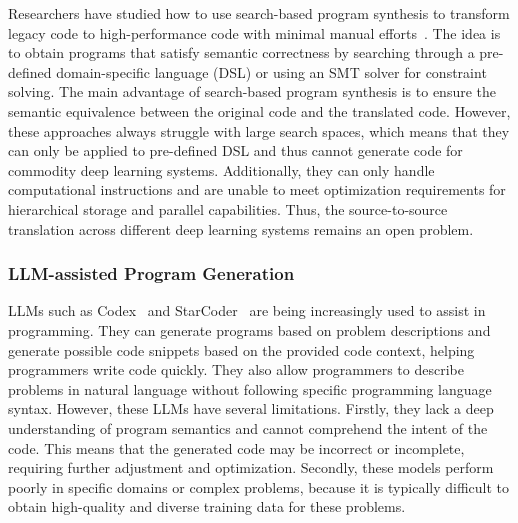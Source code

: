 Researchers have studied how to use search-based program synthesis to transform legacy code to high-performance code with minimal manual efforts~\cite{ikarashi2022exocompilation,bansal2023mosaic,vanhattumvectorization, bhatia_et_al:LIPIcs.ECOOP.2023.38}.
The idea is to obtain programs that satisfy semantic correctness by searching through a pre-defined domain-specific language (DSL) or using an SMT solver for constraint solving.
The main advantage of search-based program synthesis is to ensure
the semantic equivalence between the original code and the translated code.
However, these approaches always struggle with large search spaces, which means that they can only be applied to pre-defined DSL and thus cannot generate code for commodity deep learning systems. Additionally, they can only handle computational instructions and are unable to meet optimization requirements for hierarchical storage and parallel capabilities. Thus, the source-to-source translation across different deep learning systems remains an open problem.

\subsubsection{LLM-assisted Program Generation}
LLMs such as Codex~\cite{chen2021evaluating} and StarCoder~\cite{li2023starcoder} are being increasingly used to assist in programming. They can generate programs based on problem descriptions and generate possible code snippets based on the provided code context, helping programmers write code quickly. They also allow programmers to describe problems in natural language without following specific programming language syntax.
However, these LLMs have several limitations. Firstly, they lack a deep understanding of program semantics and cannot comprehend the intent of the code. This means that the generated code may be incorrect or incomplete, requiring further adjustment and optimization. Secondly, these models perform poorly in specific domains or complex problems, because it is typically difficult to obtain high-quality and diverse training data for these problems. 

